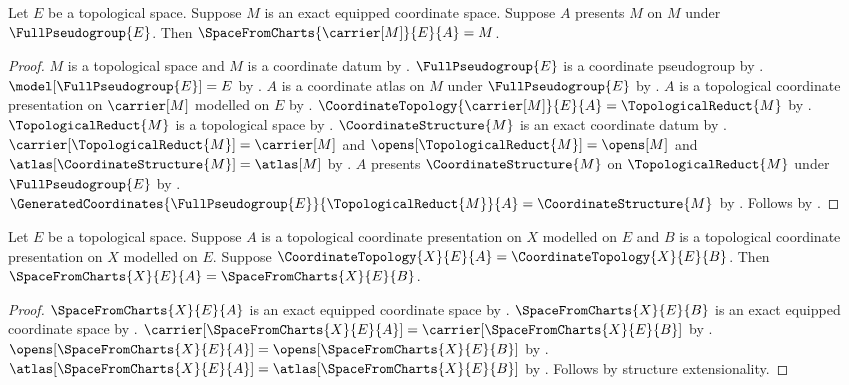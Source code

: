 \begin{theorem}\label{space_from_presented_coordinates}
    Let $E$ be a topological space.
    Suppose $M$ is an exact equipped coordinate space.
    Suppose $A$ presents $M$ on $M$ under $\FullPseudogroup{E}$.
    Then $\SpaceFromCharts{\carrier[M]}{E}{A}=M$.
\end{theorem}
\begin{proof}
    $M$ is a topological space and $M$ is a coordinate datum by .
    $\FullPseudogroup{E}$ is a coordinate pseudogroup by .
    $\model[\FullPseudogroup{E}]=E$ by .
    $A$ is a coordinate atlas on $M$ under $\FullPseudogroup{E}$ by .
    $A$ is a topological coordinate presentation on $\carrier[M]$ modelled on $E$ by
        .
    $\CoordinateTopology{\carrier[M]}{E}{A}=\TopologicalReduct{M}$ by
        .
    $\TopologicalReduct{M}$ is a topological space by .
    $\CoordinateStructure{M}$ is an exact coordinate datum by .
    $\carrier[\TopologicalReduct{M}]=\carrier[M]$ and
        $\opens[\TopologicalReduct{M}]=\opens[M]$ and
        $\atlas[\CoordinateStructure{M}]=\atlas[M]$ by
        .
    $A$ presents $\CoordinateStructure{M}$ on $\TopologicalReduct{M}$ under $\FullPseudogroup{E}$ by
        .
    $\GeneratedCoordinates{\FullPseudogroup{E}}{\TopologicalReduct{M}}{A}=\CoordinateStructure{M}$ by
        .
    Follows by .
\end{proof}

\begin{theorem}\label{space_from_charts_same_topology}
    Let $E$ be a topological space.
    Suppose $A$ is a topological coordinate presentation on $X$ modelled on $E$ and
        $B$ is a topological coordinate presentation on $X$ modelled on $E$.
    Suppose $\CoordinateTopology{X}{E}{A}=\CoordinateTopology{X}{E}{B}$.
    Then $\SpaceFromCharts{X}{E}{A}=\SpaceFromCharts{X}{E}{B}$.
\end{theorem}
\begin{proof}
    $\SpaceFromCharts{X}{E}{A}$ is an exact equipped coordinate space by
        .
    $\SpaceFromCharts{X}{E}{B}$ is an exact equipped coordinate space by
        .
    $\carrier[\SpaceFromCharts{X}{E}{A}]=\carrier[\SpaceFromCharts{X}{E}{B}]$ by
        .
    $\opens[\SpaceFromCharts{X}{E}{A}]=\opens[\SpaceFromCharts{X}{E}{B}]$ by
        .
    $\atlas[\SpaceFromCharts{X}{E}{A}]=\atlas[\SpaceFromCharts{X}{E}{B}]$ by
        .
    Follows by structure extensionality.
\end{proof}

